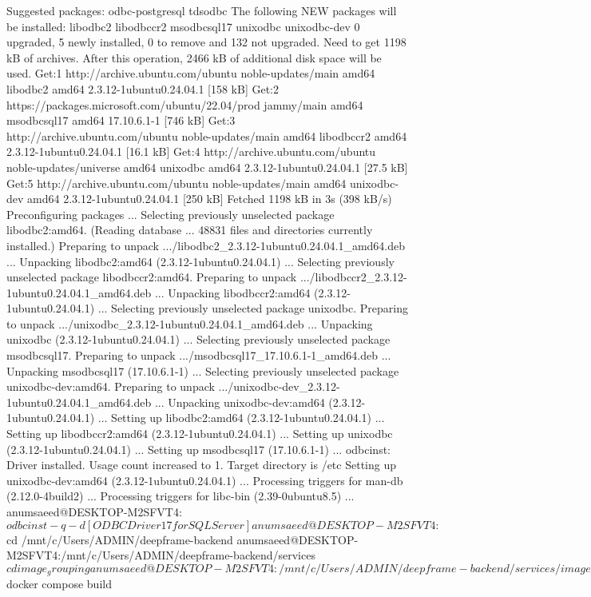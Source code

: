 Suggested packages:
  odbc-postgresql tdsodbc
The following NEW packages will be installed:
  libodbc2 libodbccr2 msodbcsql17 unixodbc unixodbc-dev
0 upgraded, 5 newly installed, 0 to remove and 132 not upgraded.
Need to get 1198 kB of archives.
After this operation, 2466 kB of additional disk space will be used.
Get:1 http://archive.ubuntu.com/ubuntu noble-updates/main amd64 libodbc2 amd64 2.3.12-1ubuntu0.24.04.1 [158 kB]
Get:2 https://packages.microsoft.com/ubuntu/22.04/prod jammy/main amd64 msodbcsql17 amd64 17.10.6.1-1 [746 kB]
Get:3 http://archive.ubuntu.com/ubuntu noble-updates/main amd64 libodbccr2 amd64 2.3.12-1ubuntu0.24.04.1 [16.1 kB]
Get:4 http://archive.ubuntu.com/ubuntu noble-updates/universe amd64 unixodbc amd64 2.3.12-1ubuntu0.24.04.1 [27.5 kB]
Get:5 http://archive.ubuntu.com/ubuntu noble-updates/main amd64 unixodbc-dev amd64 2.3.12-1ubuntu0.24.04.1 [250 kB]
Fetched 1198 kB in 3s (398 kB/s)
Preconfiguring packages ...
Selecting previously unselected package libodbc2:amd64.
(Reading database ... 48831 files and directories currently installed.)
Preparing to unpack .../libodbc2_2.3.12-1ubuntu0.24.04.1_amd64.deb ...
Unpacking libodbc2:amd64 (2.3.12-1ubuntu0.24.04.1) ...
Selecting previously unselected package libodbccr2:amd64.
Preparing to unpack .../libodbccr2_2.3.12-1ubuntu0.24.04.1_amd64.deb ...
Unpacking libodbccr2:amd64 (2.3.12-1ubuntu0.24.04.1) ...
Selecting previously unselected package unixodbc.
Preparing to unpack .../unixodbc_2.3.12-1ubuntu0.24.04.1_amd64.deb ...
Unpacking unixodbc (2.3.12-1ubuntu0.24.04.1) ...
Selecting previously unselected package msodbcsql17.
Preparing to unpack .../msodbcsql17_17.10.6.1-1_amd64.deb ...
Unpacking msodbcsql17 (17.10.6.1-1) ...
Selecting previously unselected package unixodbc-dev:amd64.
Preparing to unpack .../unixodbc-dev_2.3.12-1ubuntu0.24.04.1_amd64.deb ...
Unpacking unixodbc-dev:amd64 (2.3.12-1ubuntu0.24.04.1) ...
Setting up libodbc2:amd64 (2.3.12-1ubuntu0.24.04.1) ...
Setting up libodbccr2:amd64 (2.3.12-1ubuntu0.24.04.1) ...
Setting up unixodbc (2.3.12-1ubuntu0.24.04.1) ...
Setting up msodbcsql17 (17.10.6.1-1) ...
odbcinst: Driver installed. Usage count increased to 1.
    Target directory is /etc
Setting up unixodbc-dev:amd64 (2.3.12-1ubuntu0.24.04.1) ...
Processing triggers for man-db (2.12.0-4build2) ...
Processing triggers for libc-bin (2.39-0ubuntu8.5) ...
anumsaeed@DESKTOP-M2SFVT4:~$ odbcinst -q -d
[ODBC Driver 17 for SQL Server]
anumsaeed@DESKTOP-M2SFVT4:~$ cd /mnt/c/Users/ADMIN/deepframe-backend
anumsaeed@DESKTOP-M2SFVT4:/mnt/c/Users/ADMIN/deepframe-backend/services$ cd image_grouping
anumsaeed@DESKTOP-M2SFVT4:/mnt/c/Users/ADMIN/deepframe-backend/services/image_grouping$ docker compose build

